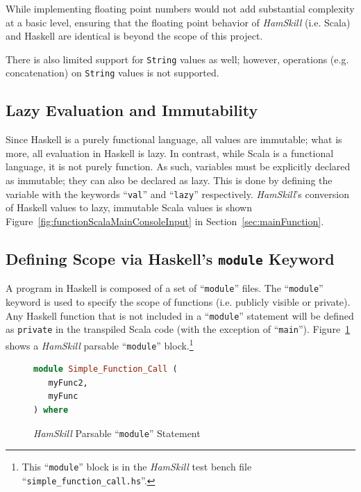 \documentclass{report}
\begin{document}
While implementing floating point numbers would not add substantial complexity at a basic level, ensuring that the floating point behavior of \emph{HamSkill} (i.e. Scala) and Haskell are identical is beyond the scope of this project.

There is also limited support for \texttt{String} values as well; however, operations (e.g. concatenation) on \texttt{String} values is not supported.

\subsection{Lazy Evaluation and Immutability}

Since Haskell is a purely functional language, all values are immutable; what is more, all evaluation in Haskell is lazy.  In contrast, while Scala is a functional language, it is not purely function.  As such, variables must be explicitly declared as immutable; they can also be declared as lazy.  This is done by defining the variable with the keywords ``\texttt{val}'' and ``\texttt{lazy}'' respectively.  \textit{HamSkill}'s conversion of Haskell values to lazy, immutable Scala values is shown Figure~\ref{fig:functionScalaMainConsoleInput} in Section~\ref{sec:mainFunction}.

\subsection{Defining Scope via Haskell's {\tt module} Keyword}

A program in Haskell is composed of a set of ``{\tt module}'' files.  The ``{\tt module}'' keyword is used to specify the scope of functions (i.e. publicly visible or private). Any Haskell function that is not included in a ``\texttt{module}'' statement will be defined as \texttt{private} in the transpiled Scala code (with the exception of ``\texttt{main}'').  Figure~\ref{fig:haskellModule} shows a \textit{HamSkill} parsable ``\texttt{module}'' block.\footnote{This ``\texttt{module}'' block is in the \textit{HamSkill} test bench file ``\texttt{simple\_function\_call.hs}''.}

\begin{figure}[H]
\begin{mdframed}
\begin{lstlisting}[language=Haskell]
module Simple_Function_Call (
   myFunc2,
   myFunc
) where
\end{lstlisting}
\end{mdframed}
\caption{\textit{HamSkill} Parsable ``\texttt{module}'' Statement}\label{fig:haskellModule}
\end{figure}
\end{document}
